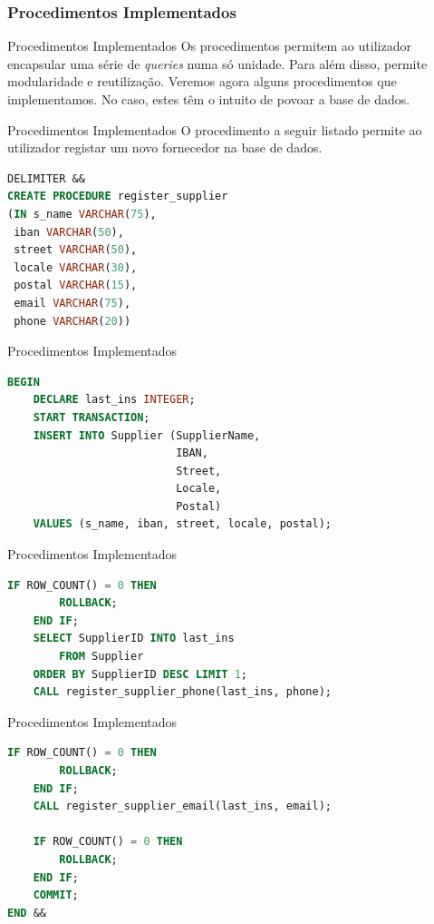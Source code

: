 \documentclass[compress,svgnames,handout,13.7pt]{beamer}
\begin{document}
\subsubsection{Procedimentos Implementados}
\begin{frame}{Procedimentos Implementados}
Os procedimentos permitem ao utilizador encapsular uma série de \textit{queries} numa só unidade. Para além disso, permite modularidade e reutilização.
Veremos agora alguns procedimentos que implementamos. No caso, estes têm o intuito de povoar a base de dados.
\end{frame}

\begin{frame}[fragile]{Procedimentos Implementados}
O procedimento a seguir listado permite ao utilizador registar um novo fornecedor na base de dados.
\begin{lstlisting}[language=sql]
DELIMITER &&
CREATE PROCEDURE register_supplier 
(IN s_name VARCHAR(75), 
 iban VARCHAR(50),
 street VARCHAR(50), 
 locale VARCHAR(30), 
 postal VARCHAR(15), 
 email VARCHAR(75), 
 phone VARCHAR(20))

\end{lstlisting}
\end{frame}
\begin{frame}[fragile]{Procedimentos Implementados}
\begin{lstlisting}[language=sql] 
BEGIN
    DECLARE last_ins INTEGER;
    START TRANSACTION;
    INSERT INTO Supplier (SupplierName, 
                          IBAN, 
                          Street, 
                          Locale, 
                          Postal)
    VALUES (s_name, iban, street, locale, postal);
\end{lstlisting}
\end{frame}
\begin{frame}[fragile]{Procedimentos Implementados}
\begin{lstlisting}[language=sql]
    IF ROW_COUNT() = 0 THEN
        ROLLBACK;
    END IF;
    SELECT SupplierID INTO last_ins 
        FROM Supplier 
    ORDER BY SupplierID DESC LIMIT 1;
    CALL register_supplier_phone(last_ins, phone);
\end{lstlisting}
\end{frame}
\begin{frame}[fragile]{Procedimentos Implementados}
\begin{lstlisting}[language=sql]
    IF ROW_COUNT() = 0 THEN
        ROLLBACK;
    END IF;
    CALL register_supplier_email(last_ins, email);

    IF ROW_COUNT() = 0 THEN
        ROLLBACK;
    END IF;
    COMMIT;
END &&
\end{lstlisting}
\end{frame}
\end{document}
